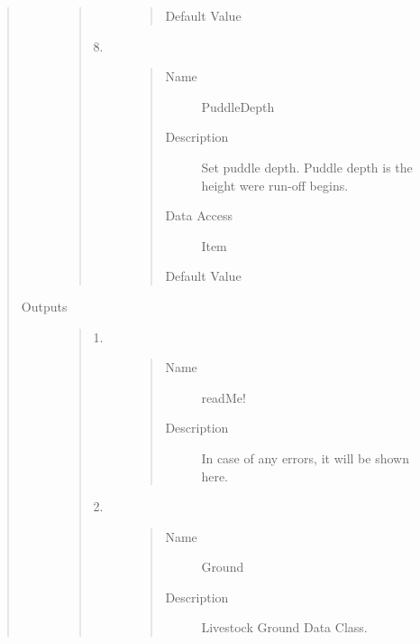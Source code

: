 \documentclass[letterpaper,10pt,english]{sphinxmanual}
\begin{document}
\begin{quote}
\begin{description}
\begin{quote}
\begin{description}
\begin{quote}
\begin{description}
\item[{Default Value}] \leavevmode
{}

\end{description}\end{quote}

\item[{8.}] \leavevmode\begin{quote}\begin{description}
\item[{Name}] \leavevmode
PuddleDepth

\item[{Description}] \leavevmode
Set puddle depth. Puddle depth is the height were run-off begins.

\item[{Data Access}] \leavevmode
Item

\item[{Default Value}] \leavevmode
{}

\end{description}\end{quote}

\end{description}\end{quote}

\item[{Outputs}] \leavevmode\begin{quote}\begin{description}
\item[{1.}] \leavevmode\begin{quote}\begin{description}
\item[{Name}] \leavevmode
readMe!

\item[{Description}] \leavevmode
In case of any errors, it will be shown here.

\end{description}\end{quote}

\item[{2.}] \leavevmode\begin{quote}\begin{description}
\item[{Name}] \leavevmode
Ground

\item[{Description}] \leavevmode
Livestock Ground Data Class.

\end{description}\end{quote}

\end{description}\end{quote}

\end{description}\end{quote}
\end{document}
